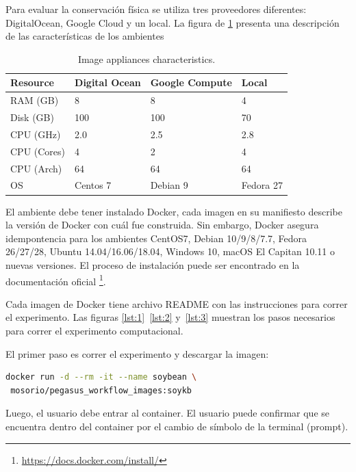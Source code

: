 Para evaluar la conservación física se utiliza tres proveedores diferentes: DigitalOcean, Google Cloud y un local. La figura de \ref{image-env} presenta una descripción de las características de los ambientes    

\begin{table}[]
\centering
\begin{tabular}{|l|l|l|l|}
\hline
Resource   & Digital Ocean & Google Compute & Local     \\ \hline
RAM (GB)   & 8             & 8              & 4         \\ \hline
Disk (GB)  & 100           & 100            & 70        \\ \hline
CPU (GHz)  & 2.0           & 2.5            & 2.8          \\ \hline
CPU (Cores)& 4             & 2              & 4          \\ \hline
CPU (Arch) & 64            & 64             & 64        \\ \hline
OS         & Centos 7      & Debian 9       & Fedora 27 \\ \hline
\end{tabular}
\caption{Image appliances characteristics.}
\label{image-env}
\end{table}

El ambiente debe tener instalado Docker, cada imagen en su manifiesto describe la versión de Docker con cuál fue construida. Sin embargo, Docker asegura idempontencia para los ambientes CentOS7, Debian 10/9/8/7.7, Fedora 26/27/28, Ubuntu 14.04/16.06/18.04, Windows 10, macOS El Capitan 10.11 o nuevas versiones.
El proceso de instalación puede ser encontrado en la documentación oficial \footnote{\url{https://docs.docker.com/install/}}.

Cada imagen de Docker tiene archivo README con las instrucciones para correr el experimento. Las figuras \ref{lst:1}~\ref{lst:2} y~\ref{lst:3}  muestran los pasos necesarios para correr el experimento computacional. 

El primer paso es correr el experimento y descargar la imagen:

\begin{lstlisting}[caption={Descargar y correr la imagen disponible en DockerHub mosorio/pegasus\_workflow\_images:soykb},label={lst:1},language=bash]
docker run -d --rm -it --name soybean \
 mosorio/pegasus_workflow_images:soykb
\end{lstlisting}

Luego, el usuario debe entrar al container. El usuario puede confirmar que se encuentra dentro del container por el cambio de símbolo de la terminal  (prompt).


